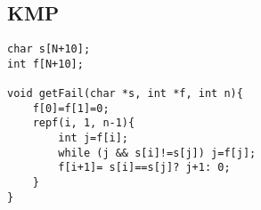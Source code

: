 \subsection{KMP}
\begin{lstlisting}
char s[N+10];
int f[N+10];

void getFail(char *s, int *f, int n){
    f[0]=f[1]=0; 
    repf(i, 1, n-1){
        int j=f[i];
        while (j && s[i]!=s[j]) j=f[j];
        f[i+1]= s[i]==s[j]? j+1: 0;
    }
}
\end{lstlisting}
